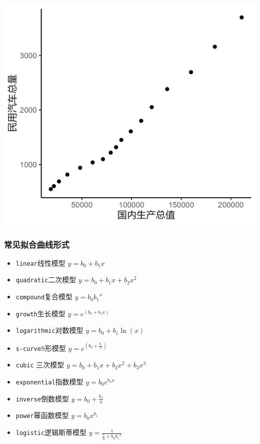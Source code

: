 \documentclass[
]{article}
\providecommand{\tightlist}{%
  \setlength{\itemsep}{0pt}\setlength{\parskip}{0pt}}
\begin{document}
\begin{center}\includegraphics[width=1\linewidth,height=1\textheight]{../picture/rmd/exp5/fig1} \end{center}

\subsubsection{常见拟合曲线形式}\label{ux5e38ux89c1ux62dfux5408ux66f2ux7ebfux5f62ux5f0f}

\begin{itemize}
\tightlist
\item
  \texttt{linear}线性模型 \(y = b_0 + b_1 x\)
\item
  \texttt{quadratic}二次模型 \(y = b_0+b_1x+b_2x^2\)
\item
  \texttt{compound}复合模型 \(y = b_0{b_1}^x\)
\item
  \texttt{growth}生长模型 \(y = e^{(b_0 + b_1 x)}\)
\item
  \texttt{logarithmic}对数模型 \(y=b_0+b_1\ln(x)\)
\item
  \texttt{s-curve}S形模型 \(y = e^{(b_0 + \frac{b_1}{x})}\)
\item
  \texttt{cubic} 三次模型 \(y = b_0+b_1x+b_2x^2+b_3x^3\)
\item
  \texttt{exponential}指数模型 \(y = b_0 e^{b_1x}\)
\item
  \texttt{inverse}倒数模型 \(y = b_0 + \frac{b_1}{x}\)
\item
  \texttt{power}幂函数模型 \(y = b_0 x^{b_1}\)
\item
  \texttt{logistic}逻辑斯蒂模型 \(y = \frac{1}{\frac{1}{u}+b_0{b_1}^x}\)
\end{itemize}
\end{document}
